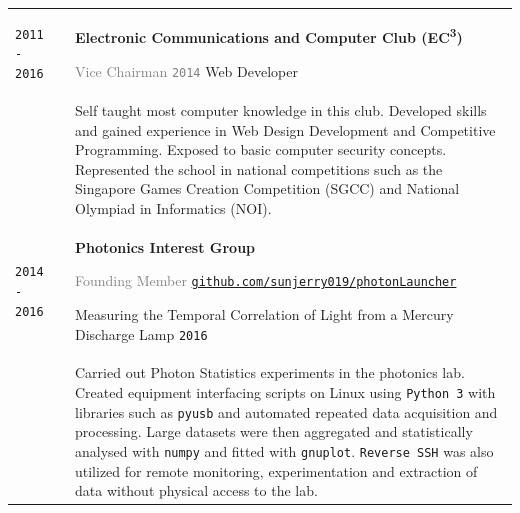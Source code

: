 \documentclass[11pt]{article}
\newcommand{\linkout}[2]{\href{#1}{\textcolor{text_link}{#2}}}
\newcommand{\code}[1]{\colorbox{code_back}{\texttt{#1}}}
\begin{document}
{
	\renewcommand{\arraystretch}{2}
	\begin{tabularx}{\textwidth}{@{}l p{0.3cm} X@{}}
		\texttt{\large 2011 - 2016} & & \textbf{Electronic Communications and Computer Club (EC\textsuperscript{3})} \par\textcolor{gray}{Vice Chairman \hspace{1em} \texttt{2014}} \hfill Web Developer\\[-0.5em]
		&&  Self taught most computer knowledge in this club. Developed skills and gained experience in Web Design Development and Competitive Programming. Exposed to basic computer security concepts. Represented the school in national competitions such as the Singapore Games Creation Competition {\footnotesize (SGCC)} and National Olympiad in Informatics {\footnotesize (NOI)}. \\
		\texttt{\large 2014 - 2016} & & \textbf{Photonics Interest Group} \par\textcolor{gray}{Founding Member} \hfill \linkout{https://github.com/sunjerry019/photonLauncher}{\texttt{\small github.com/sunjerry019/photonLauncher}}\par {\scriptsize Measuring the Temporal Correlation of Light from a Mercury Discharge Lamp \hfill\texttt{2016}}\\[-0.5em]
		&& {\small Carried out Photon Statistics experiments in the photonics lab. Created equipment interfacing scripts on Linux using \code{Python 3} with libraries such as \code{pyusb} and automated repeated data acquisition and processing. Large datasets were then aggregated and statistically analysed with \code{numpy} and fitted with \code{gnuplot}. \code{Reverse SSH} was also utilized for remote monitoring, experimentation and extraction of data without physical access to the lab. } \\

\end{tabularx}}
\end{document}
